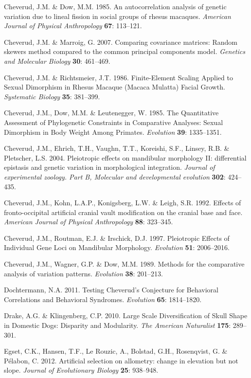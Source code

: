 \documentclass[12pt,twoside]{report}
\begin{document}
Cheverud, J.M. \& Dow, M.M. 1985. An autocorrelation analysis of genetic
variation due to lineal fission in social groups of rhesus macaques.
\emph{American Journal of Physical Anthropology} \textbf{67}: 113--121.

Cheverud, J.M. \& Marroig, G. 2007. Comparing covariance matrices:
Random skewers method compared to the common principal components model.
\emph{Genetics and Molecular Biology} \textbf{30}: 461--469.

Cheverud, J.M. \& Richtsmeier, J.T. 1986. Finite-Element Scaling Applied
to Sexual Dimorphism in Rhesus Macaque (Macaca Mulatta) Facial Growth.
\emph{Systematic Biology} \textbf{35}: 381--399.

Cheverud, J.M., Dow, M.M. \& Leutenegger, W. 1985. The Quantitative
Assessment of Phylogenetic Constraints in Comparative Analyses: Sexual
Dimorphism in Body Weight Among Primates. \emph{Evolution} \textbf{39}:
1335--1351.

Cheverud, J.M., Ehrich, T.H., Vaughn, T.T., Koreishi, S.F., Linsey, R.B.
\& Pletscher, L.S. 2004. Pleiotropic effects on mandibular morphology
II: differential epistasis and genetic variation in morphological
integration. \emph{Journal of experimental zoology. Part B, Molecular
and developmental evolution} \textbf{302}: 424--435.

Cheverud, J.M., Kohn, L.A.P., Konigsberg, L.W. \& Leigh, S.R. 1992.
Effects of fronto-occipital artificial cranial vault modification on the
cranial base and face. \emph{American Journal of Physical Anthropology}
\textbf{88}: 323--345.

Cheverud, J.M., Routman, E.J. \& Irschick, D.J. 1997. Pleiotropic
Effects of Individual Gene Loci on Mandibular Morphology.
\emph{Evolution} \textbf{51}: 2006--2016.

Cheverud, J.M., Wagner, G.P. \& Dow, M.M. 1989. Methods for the
comparative analysis of variation patterns. \emph{Evolution}
\textbf{38}: 201--213.

Dochtermann, N.A. 2011. Testing Cheverud's Conjecture for Behavioral
Correlations and Behavioral Syndromes. \emph{Evolution} \textbf{65}:
1814--1820.

Drake, A.G. \& Klingenberg, C.P. 2010. Large Scale Diversification of
Skull Shape in Domestic Dogs: Disparity and Modularity. \emph{The
American Naturalist} \textbf{175}: 289--301.

Egset, C.K., Hansen, T.F., Le Rouzic, A., Bolstad, G.H., Rosenqvist, G.
\& Pélabon, C. 2012. Artificial selection on allometry: change in
elevation but not slope. \emph{Journal of Evolutionary Biology}
\textbf{25}: 938--948.
\end{document}
